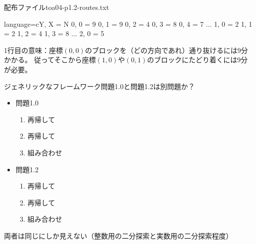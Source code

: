 \documentclass{beamer}
\begin{document}
\begin{frame}[fragile]{配布ファイル}{toa04-p1.2-routes.txt}
\begin{codeof}{language=c}{Y, X = N}
 0, 0 = 9
 0, 1 = 9
 0, 2 = 4
 0, 3 = 8
 0, 4 = 7
...
 1, 0 = 2
 1, 1 = 2
 1, 2 = 4
 1, 3 = 8
...
 2, 0 = 5
\end{codeof}

1行目の意味：座標$(0, 0)$のブロックを（どの方向であれ）通り抜けるには9分かかる。
従ってそこから座標$(1,0)$や$(0,1)$のブロックにたどり着くには9分が必要。
\end{frame}

\begin{frame}[fragile]{ジェネリックなフレームワーク}{問題1.0と問題1.2は別問題か？}
\begin{itemize}%
\item 問題1.0
\begin{enumerate}%
\item 再帰して
\item 再帰して
\item 組み合わせ
\end{enumerate}
\item 問題1.2
\begin{enumerate}%
\item 再帰して
\item 再帰して
\item 組み合わせ
\end{enumerate}
\end{itemize}

\vfill
両者は同じにしか見えない（整数用の二分探索と実数用の二分探索程度）
\end{frame}
\end{document}
